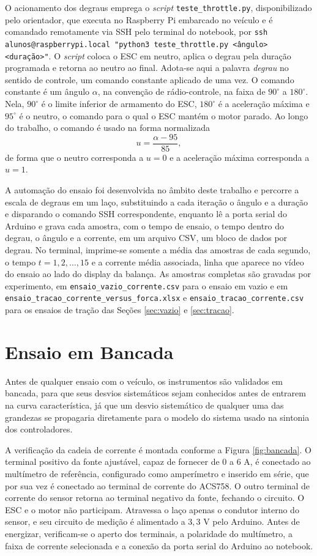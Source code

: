 O acionamento dos degraus emprega o \emph{script} \texttt{teste\_throttle.py},
disponibilizado pelo orientador, que executa no Raspberry Pi embarcado no veículo e é
comandado remotamente via SSH pelo terminal do notebook, por \texttt{ssh
alunos@raspberrypi.local "python3 teste\_throttle.py <ângulo> <duração>"}. O \emph{script}
coloca o ESC em neutro, aplica o degrau pela duração programada e retorna ao neutro ao
final. Adota-se aqui a palavra \emph{degrau} no sentido de controle, um comando constante
aplicado de uma vez. O comando constante é um ângulo $\alpha$, na convenção de rádio-controle,
na faixa de $90^\circ$ a $180^\circ$. Nela, $90^\circ$ é o limite inferior de armamento do
ESC, $180^\circ$ é a aceleração máxima e $95^\circ$ é o neutro, o comando para o qual o ESC
mantém o motor parado. Ao longo do trabalho, o comando é usado na forma normalizada
\[
u = \frac{\alpha - 95}{85},
\]
de forma que o neutro corresponda a $u = 0$ e a aceleração
máxima corresponda a $u = 1$.

A automação do ensaio foi desenvolvida no âmbito deste trabalho e percorre a escala de
degraus em um laço, substituindo a cada iteração o ângulo e a duração e disparando o comando
SSH correspondente, enquanto lê a porta serial do Arduino e grava cada amostra, com o tempo
de ensaio, o tempo dentro do degrau, o ângulo e a corrente, em um arquivo CSV, um bloco de
dados por degrau. No terminal, imprime-se somente a média das amostras de cada segundo, o
tempo $t = 1, 2, \ldots, 15$ e a corrente média associada, linha que aparece no vídeo do
ensaio ao lado do display da balança. As amostras completas são gravadas por experimento,
em \texttt{ensaio\_vazio\_corrente.csv} para o ensaio em vazio e em
\texttt{ensaio\_tracao\_corrente\_versus\_forca.xlsx} e
\texttt{ensaio\_tracao\_corrente.csv} para os ensaios de tração das Seções
\ref{sec:vazio} e \ref{sec:tracao}. 

\section{Ensaio em Bancada}
\label{sec:bancada}

Antes de qualquer ensaio com o veículo, os instrumentos são validados em bancada, para que
seus desvios sistemáticos sejam conhecidos antes de entrarem na curva característica, já
que um desvio sistemático de qualquer uma das grandezas se propagaria diretamente para o
modelo do sistema usado na sintonia dos controladores.

A verificação da cadeia de corrente é montada conforme a Figura \ref{fig:bancada}. O
terminal positivo da fonte ajustável, capaz de fornecer de $0$ a $6$ A, é conectado ao
multímetro de referência, configurado como amperímetro e inserido em série, que por sua vez
é conectado ao terminal de corrente do ACS758. O outro terminal de corrente do sensor
retorna ao terminal negativo da fonte, fechando o circuito. O ESC e o motor não
participam. Atravessa o laço apenas o condutor interno do sensor, e seu circuito de
medição é alimentado a $3{,}3$ V pelo Arduino. Antes de energizar, verificam-se o aperto dos
terminais, a polaridade do multímetro, a faixa de corrente selecionada e a conexão da porta
serial do Arduino ao notebook.

